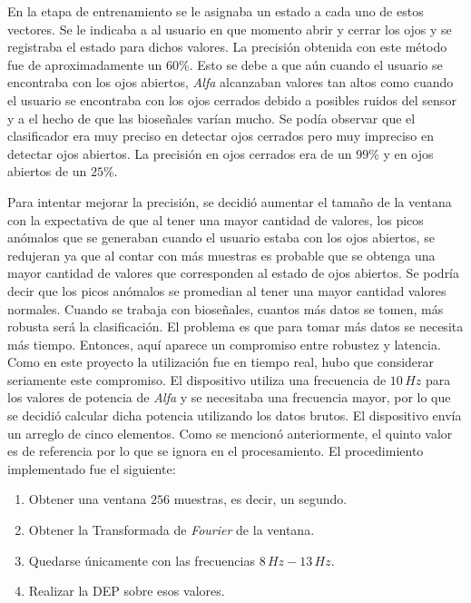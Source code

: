 En la etapa de entrenamiento se le asignaba un estado a cada uno de estos vectores. Se le indicaba a al usuario en que momento abrir y cerrar los ojos y se registraba el estado para dichos valores. La precisión obtenida con este método fue de aproximadamente un $60\%$. Esto se debe a que aún cuando el usuario se encontraba con los ojos abiertos, \emph{Alfa} alcanzaban valores tan altos como cuando el usuario se encontraba con los ojos cerrados debido a posibles ruidos del sensor y a el hecho de que las bioseñales varían mucho. Se podía observar que el clasificador era muy preciso en detectar ojos cerrados pero muy impreciso en detectar ojos abiertos. La precisión en ojos cerrados era de un $99\%$ y en ojos abiertos de un $25\%$.

Para intentar mejorar la precisión, se decidió aumentar el tamaño de la ventana con la expectativa de que al tener una mayor cantidad de valores, los picos anómalos que se generaban cuando el usuario estaba con los ojos abiertos, se redujeran ya que al contar con más muestras es probable que se obtenga una mayor cantidad de valores que corresponden al estado de ojos abiertos. Se podría decir que los picos anómalos se promedian al tener una mayor cantidad valores normales. Cuando se trabaja con bioseñales, cuantos más datos se tomen, más robusta será la clasificación. El problema es que para tomar más datos se necesita más tiempo. Entonces, aquí aparece un compromiso entre robustez y latencia. Como en este proyecto la utilización fue en tiempo real, hubo que considerar seriamente este compromiso. El dispositivo utiliza una frecuencia de $10 \, Hz$ para los valores de potencia de \emph{Alfa} y se necesitaba una frecuencia mayor, por lo que se decidió calcular dicha potencia utilizando los datos brutos. El dispositivo envía un arreglo de cinco elementos. Como se mencionó anteriormente, el quinto valor es de referencia por lo que se ignora en el procesamiento. El procedimiento implementado fue el siguiente:

 \begin{enumerate}
 \item Obtener una ventana $256$ muestras, es decir, un segundo.
 \item Obtener la Transformada de \emph{Fourier} de la ventana.
 \item Quedarse únicamente con las frecuencias $8 \, Hz-13 \, Hz$.
 \item Realizar la DEP sobre esos valores.
 \end{enumerate}
 
